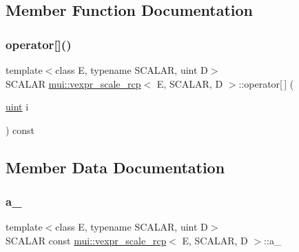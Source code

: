 \subsection{Member Function Documentation}
\mbox{\label{structmui_1_1vexpr__scale__rcp_a515eb7fc3d3509ae79c9edc2eb1d4455}} 
\subsubsection{\texorpdfstring{operator[]()}{operator[]()}}
{\footnotesize\ttfamily template$<$class E, typename S\+C\+A\+L\+AR, uint D$>$ \\
S\+C\+A\+L\+AR \hyperlink{structmui_1_1vexpr__scale__rcp}{mui\+::vexpr\+\_\+scale\+\_\+rcp}$<$ E, S\+C\+A\+L\+AR, D $>$\+::operator\mbox{[}$\,$\mbox{]} (\begin{DoxyParamCaption}\item[{\hyperlink{namespacemui_af15a3e7188a2117fb9965277bb0cacd2}{uint}}]{i }\end{DoxyParamCaption}) const\hspace{0.3cm}{\ttfamily [inline]}}



\subsection{Member Data Documentation}
\mbox{\label{structmui_1_1vexpr__scale__rcp_a9011d5a588003afb678c4ca1f531564b}} 
\subsubsection{\texorpdfstring{a\+\_\+}{a\_}}
{\footnotesize\ttfamily template$<$class E, typename S\+C\+A\+L\+AR, uint D$>$ \\
S\+C\+A\+L\+AR const \hyperlink{structmui_1_1vexpr__scale__rcp}{mui\+::vexpr\+\_\+scale\+\_\+rcp}$<$ E, S\+C\+A\+L\+AR, D $>$\+::a\+\_\+\hspace{0.3cm}{\ttfamily [protected]}}


